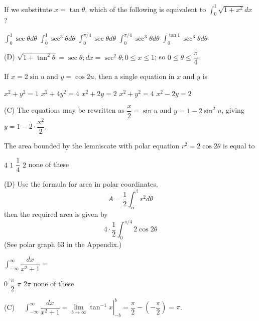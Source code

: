 \newpage





\question
If we substitute $x=\tan \theta$, which of the following is equivalent to $\displaystyle\int_{0}^{1} \sqrt{1+x^{2}} d x$ ?
\begin{choices}
  \choice $\displaystyle\int_{0}^{1} \sec \theta d \theta$
  \choice $\displaystyle\int_{0}^{1} \sec ^{3} \theta d \theta$
  \choice $\displaystyle\int_{0}^{\pi / 4} \sec \theta d \theta$
  \CorrectChoice $\displaystyle\int_{0}^{\pi / 4} \sec ^{3} \theta d \theta$
  \choice $\displaystyle\int_{0}^{\tan 1} \sec ^{3} \theta d \theta$
\end{choices}
\begin{solution}
(D) $\sqrt{1+\tan ^{2} \theta}=\sec \theta ; d x=\sec ^{2} \theta ; 0 \leqslant x \leqslant 1$; so $0 \leq \theta \leq \dfrac{\pi}{4}$.
\end{solution}

\question
If $x=2 \sin u$ and $y=\cos 2 u$, then a single equation in $x$ and $y$ is
\begin{choices}
  \choice $x^{2}+y^{2}=1$
  \choice $x^{2}+4 y^{2}=4$
  \CorrectChoice $x^{2}+2 y=2$
  \choice $x^{2}+y^{2}=4$
  \choice $x^{2}-2 y=2$
\end{choices}
\begin{solution}
(C) The equations may be rewritten as $\dfrac{x}{2}=\sin u$ and $y=1-2 \sin ^{2} u$, giving $y=1-2 \cdot \dfrac{x^{2}}{2}$.
\end{solution}

\question
The area bounded by the lemniscate with polar equation $r^{2}=2 \cos 2 \theta$ is equal to
\begin{choices}
  \choice $4$
  \choice $1$
  \choice $\dfrac{1}{4}$
  \CorrectChoice $2$
  \choice none of these
\end{choices}
\begin{solution}
(D) Use the formula for area in polar coordinates,
\[
A=\dfrac{1}{2} \displaystyle\int_{\alpha}^{\beta} r^{2} d \theta
\]
then the required area is given by
\[
4 \cdot \dfrac{1}{2} \displaystyle\int_{0}^{\pi / 4} 2 \cos 2 \theta
\]
(See polar graph 63 in the Appendix.)
\end{solution}


\newpage





\question
$\displaystyle\int_{-\infty}^{\infty} \dfrac{d x}{x^{2}+1}=$
\begin{choices}
  \choice $0$
  \choice $\dfrac{\pi}{2}$
  \CorrectChoice $\pi$
  \choice $2 \pi$
  \choice none of these
\end{choices}
\begin{solution}
(C) $\quad \displaystyle\int_{-\infty}^{\infty} \dfrac{d x}{x^{2}+1}=\left.\lim\limits_{b \to \infty} \tan ^{-1} x\right|_{-b} ^{b}=\dfrac{\pi}{2}-\left(-\dfrac{\pi}{2}\right)=\pi$.
\end{solution}

